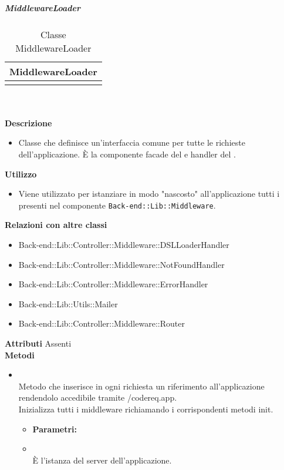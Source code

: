 			\subparagraph{MiddlewareLoader} 
\begin{table}[ht]
\begin{center}
\bgroup
	\setlength{\arrayrulewidth}{0.6mm}
	\def\arraystretch{1}
		\begin{tabular}{ | p{12cm} | }
				\hline  
					\centerline{\textbf{MiddlewareLoader}}
		\\ \hline 
				\hline
					\code{+init(app:ServerApp)} \\ 
				\hline
		
		\end{tabular}
\egroup
\caption{Classe MiddlewareLoader}
\end{center}
\end{table} \textbf{\\ \\ Descrizione}
\begin{itemize}
\item[] Classe che definisce un'interfaccia comune per tutte le richieste dell'applicazione. È la componente facade del   e handler del  .
\end{itemize} 
\textbf{Utilizzo}
\begin{itemize}
\item[] Viene utilizzato per istanziare in modo "nascosto" all'applicazione tutti i  presenti nel componente \texttt{Back-end::Lib::Middleware}.
\end{itemize}
\textbf{Relazioni con altre classi}
\begin{itemize}
\item{Back-end::Lib::Controller::Middleware::DSLLoaderHandler}
\item{Back-end::Lib::Controller::Middleware::NotFoundHandler}
\item{Back-end::Lib::Controller::Middleware::ErrorHandler}
\item{Back-end::Lib::Utils::Mailer}
\item{Back-end::Lib::Controller::Middleware::Router}
\end{itemize}
\textbf{Attributi}
Assenti \\
\textbf{Metodi}
\begin{itemize}
\item[] \textbf{} \\ Metodo che inserisce in ogni richiesta un riferimento all'applicazione rendendolo accedibile  tramite /code{req.app}. \\
Inizializza tutti i middleware richiamando i corrispondenti metodi init.
\begin{itemize}\addtolength{\itemsep}{-0.5\baselineskip}
\item[] \textbf{Parametri:}
\item[]  \\ È l'istanza del server dell'applicazione.
\end{itemize}
\end{itemize}

